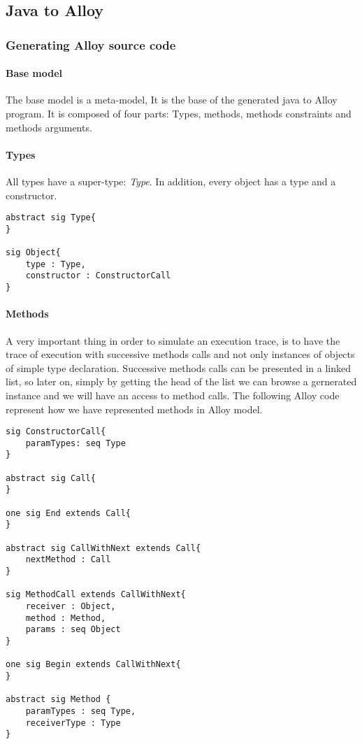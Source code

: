 \subsection{Java to Alloy}
\subsubsection{Generating Alloy source code}
\paragraph{Base model}
The base model is a meta-model, It is the base of the generated java to Alloy program.
It is composed of four parts: Types, methods, methods constraints and methods arguments.

\lstset{language=Alloy}

\paragraph{Types} All types have a super-type: \textit{Type}. In addition, every object has a type and a constructor.
\begin{lstlisting}
abstract sig Type{
}

sig Object{
    type : Type,
    constructor : ConstructorCall
}
\end{lstlisting}

\paragraph{Methods} A very important thing in order  to simulate an execution trace, is to have the trace of execution with successive methods calls and not only instances of objects of simple type declaration. Successive methods calls can be presented in a linked list, so later on, simply by getting the head of the list we can browse a gernerated instance and we will have an access to method calls. The following Alloy code represent how we have represented methods in Alloy model.

\begin{lstlisting}
sig ConstructorCall{
    paramTypes: seq Type
}

abstract sig Call{
}

one sig End extends Call{
}

abstract sig CallWithNext extends Call{
    nextMethod : Call
}

sig MethodCall extends CallWithNext{
    receiver : Object,
    method : Method,
    params : seq Object
}

one sig Begin extends CallWithNext{
}

abstract sig Method {
    paramTypes : seq Type,
    receiverType : Type
}
\end{lstlisting}

